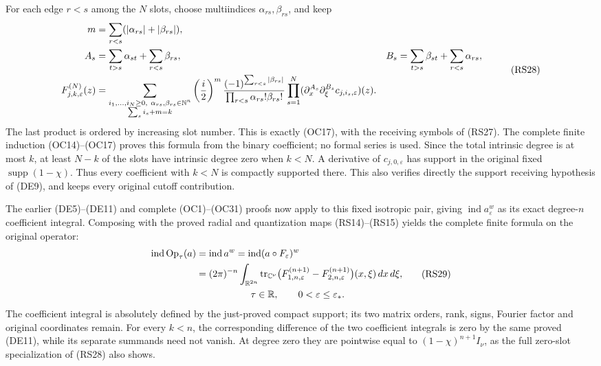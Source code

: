 \documentclass[
  11pt,
]{article}
\begin{document}
For each edge \(r<s\) among the \(N\) slots, choose multiindices
\(\alpha_{rs},\beta_{rs}\), and keep {\footnotesize\let\split\aligned\let\endsplit\endaligned
\[
 \begin{split}
 m&=\sum_{r<s}(|\alpha_{rs}|+|\beta_{rs}|),\\
 A_s&=\sum_{t>s}\alpha_{st}+\sum_{r<s}\beta_{rs},&
 B_s&=\sum_{t>s}\beta_{st}+\sum_{r<s}\alpha_{rs},\\
 F_{j,k,\varepsilon}^{(N)}(z)
 &=\sum_{\substack{i_1,\ldots,i_N\geq0,\
                        \alpha_{rs},\beta_{rs}\in\mathbb N^n\\
                    \sum_s i_s+m=k}}
       \left(\frac i2\right)^m
       \frac{(-1)^{\sum_{r<s}|\beta_{rs}|}}
            {\prod_{r<s}\alpha_{rs}!\beta_{rs}!}
       \prod_{s=1}^{N}
          (\partial_x^{A_s}\partial_\xi^{B_s}
                         c_{j,i_s,\varepsilon})(z).
 \end{split}
 \tag{RS28}
\]
} The last product is ordered by increasing slot number. This is
exactly (OC17), with the receiving symbols of (RS27). The complete
finite induction (OC14)--(OC17) proves this formula from the binary
coefficient; no formal series is used. Since the total intrinsic degree
is at most \(k\), at least \(N-k\) of the slots have intrinsic degree
zero when \(k<N\). A derivative of \(c_{j,0,\varepsilon}\) has support
in the original fixed \(\operatorname{supp}(1-\chi)\). Thus every
coefficient with \(k<N\) is compactly supported there. This also
verifies directly the support receiving hypothesis of (DE9), and keeps
every original cutoff contribution.

The earlier (DE5)--(DE11) and complete (OC1)--(OC31) proofs now apply to
this fixed isotropic pair, giving \(\operatorname{ind}a_\varepsilon^w\)
as its exact degree-\(n\) coefficient integral. Composing with the
proved radial and quantization maps (RS14)--(RS15) yields the complete
finite formula on the original operator: \[
 \begin{split}
 \operatorname{ind}\operatorname{Op}_\tau(a)
 &=\operatorname{ind}a^w
  =\operatorname{ind}(a\circ F_\varepsilon)^w\\
 &=(2\pi)^{-n}\int_{\mathbb R^{2n}}
      \operatorname{tr}_{\mathbb C^\nu}
        \bigl(F_{1,n,\varepsilon}^{(n+1)}
              -F_{2,n,\varepsilon}^{(n+1)}\bigr)(x,\xi)
                                             \,dx\,d\xi,\\
 &\hspace{20mm}
       \tau\in\mathbb R,\qquad0<\varepsilon\leq\varepsilon_* .
 \end{split}
 \tag{RS29}
\] The coefficient integral is absolutely defined by the just-proved
compact support; its two matrix orders, rank, signs, Fourier factor and
original coordinates remain. For every \(k<n\), the corresponding
difference of the two coefficient integrals is zero by the same proved
(DE11), while its separate summands need not vanish. At degree zero they
are pointwise equal to \((1-\chi)^{n+1}I_\nu\), as the full zero-slot
specialization of (RS28) also shows.
\end{document}
